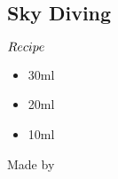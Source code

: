 \subsection{Sky Diving}
\begin{itembox}[l]{\boldmath $Recipe$}
\begin{itemize}
\setlength{\parskip}{0cm}
\setlength{\itemsep}{0cm}
\item \rum 30ml
\item \bc 20ml
\item \limj 10ml
\end{itemize}
\vspace{-4mm}
Made by \shake
\end{itembox}
